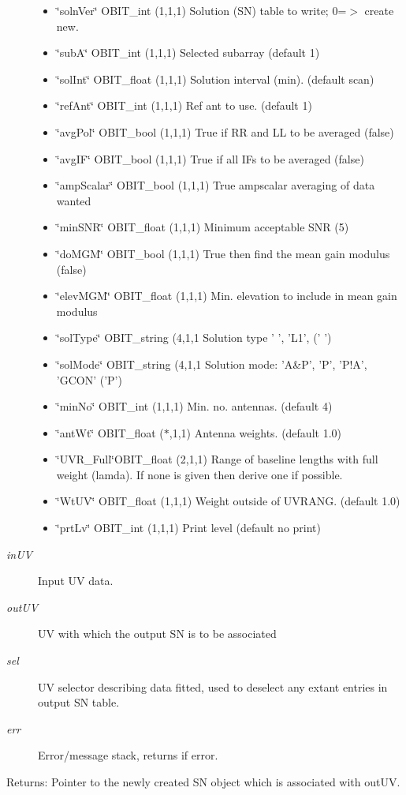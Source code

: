 \begin{Desc}
\begin{description}
\begin{itemize}
\item \char`\"{}soln\-Ver\char`\"{} OBIT\_\-int (1,1,1) Solution (SN) table to write; 0=$>$ create new. \item \char`\"{}sub\-A\char`\"{} OBIT\_\-int (1,1,1) Selected subarray (default 1) \item \char`\"{}sol\-Int\char`\"{} OBIT\_\-float (1,1,1) Solution interval (min). (default scan) \item \char`\"{}ref\-Ant\char`\"{} OBIT\_\-int (1,1,1) Ref ant to use. (default 1) \item \char`\"{}avg\-Pol\char`\"{} OBIT\_\-bool (1,1,1) True if RR and LL to be averaged (false) \item \char`\"{}avg\-IF\char`\"{} OBIT\_\-bool (1,1,1) True if all IFs to be averaged (false) \item \char`\"{}amp\-Scalar\char`\"{} OBIT\_\-bool (1,1,1) True ampscalar averaging of data wanted \item \char`\"{}min\-SNR\char`\"{} OBIT\_\-float (1,1,1) Minimum acceptable SNR (5) \item \char`\"{}do\-MGM\char`\"{} OBIT\_\-bool (1,1,1) True then find the mean gain modulus (false) \item \char`\"{}elev\-MGM\char`\"{} OBIT\_\-float (1,1,1) Min. elevation to include in mean gain modulus \item \char`\"{}sol\-Type\char`\"{} OBIT\_\-string (4,1,1 Solution type ' ', 'L1', (' ') \item \char`\"{}sol\-Mode\char`\"{} OBIT\_\-string (4,1,1 Solution mode: 'A\&P', 'P', 'P!A', 'GCON' ('P') \item \char`\"{}min\-No\char`\"{} OBIT\_\-int (1,1,1) Min. no. antennas. (default 4) \item \char`\"{}ant\-Wt\char`\"{} OBIT\_\-float ($\ast$,1,1) Antenna weights. (default 1.0) \item \char`\"{}UVR\_\-Full\char`\"{}OBIT\_\-float (2,1,1) Range of baseline lengths with full weight (lamda). If none is given then derive one if possible. \item \char`\"{}Wt\-UV\char`\"{} OBIT\_\-float (1,1,1) Weight outside of UVRANG. (default 1.0) \item \char`\"{}prt\-Lv\char`\"{} OBIT\_\-int (1,1,1) Print level (default no print) \end{itemize}
\item[{\em in\-UV}]Input UV data. \item[{\em out\-UV}]UV with which the output SN is to be associated \item[{\em sel}]UV selector describing data fitted, used to deselect any extant entries in output SN table. \item[{\em err}]Error/message stack, returns if error. \end{description}
\end{Desc}
\begin{Desc}
\item[Returns:]Pointer to the newly created SN object which is associated with out\-UV. \end{Desc}
